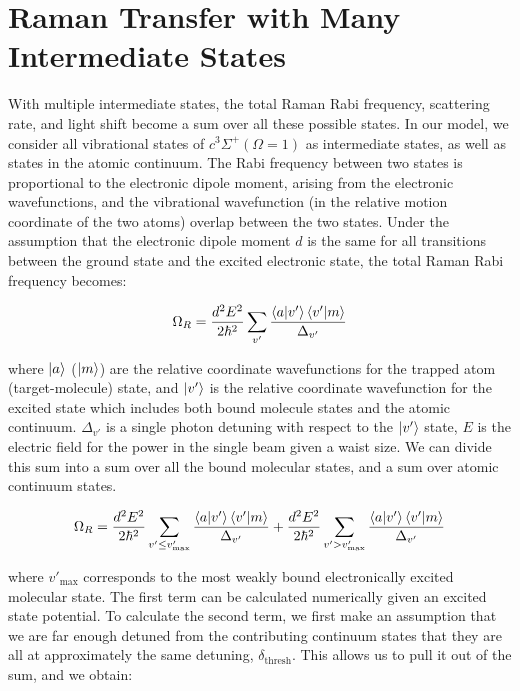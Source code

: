 \documentclass[aps,secnumarabic,amsmath,amssymb,superscriptaddress]{revtex4}
\begin{document}
\section{Raman Transfer with Many Intermediate States}
With multiple intermediate states, the total Raman Rabi frequency, scattering rate, and light shift become a sum over all these possible states. In our model, we consider all vibrational states of $ c^3\Sigma^+(\Omega = 1) $ as intermediate states, as well as states in the atomic continuum. The Rabi frequency between two states is proportional to the electronic dipole moment, arising from the electronic wavefunctions, and the vibrational wavefunction (in the relative motion coordinate of the two atoms) overlap between the two states. Under the assumption that the electronic dipole moment $ d $ is the same for all transitions between the ground state and the excited electronic state, the total Raman Rabi frequency becomes:

\begin{equation}
\Omega_R = \frac{d^2E^2}{2\hbar^2} \displaystyle\sum_{v'} \frac{\braket{a|v'}\braket{v'|m}}{\Delta_{v'}}
\end{equation}

where $\ket{a}$ ($\ket{m}$) are the relative coordinate wavefunctions for the trapped atom (target-molecule) state, and $\ket{v'}$ is the relative coordinate wavefunction for the excited state which includes both bound molecule states and the atomic continuum. $\Delta_{v'}$ is a single photon detuning with respect to the $\ket{v'}$ state, $ E $ is the electric field for the power in the single beam given a waist size. We can divide this sum into a sum over all the bound molecular states, and a sum over atomic continuum states.

\begin{equation}
\Omega_R = \frac{d^2E^2}{2\hbar^2}\displaystyle\sum_{v' \leq v'_{\text{max}}} \frac{\braket{a|v'}\braket{v'|m}}{\Delta_{v'}} +  \frac{d^2E^2}{2\hbar^2}\displaystyle\sum_{v' > v'_{\text{max}}} \frac{\braket{a|v'}\braket{v'|m}}{\Delta_{v'}} 
\end{equation}

where $ v'_{\text{max}}$ corresponds to the most weakly bound electronically excited molecular state. The first term can be calculated numerically given an excited state potential. To calculate the second term, we first make an assumption that we are far enough detuned from the contributing continuum states that they are all at approximately the same detuning, $ \delta_{\text{thresh}}$. This allows us to pull it out of the sum, and we obtain:
\end{document}
